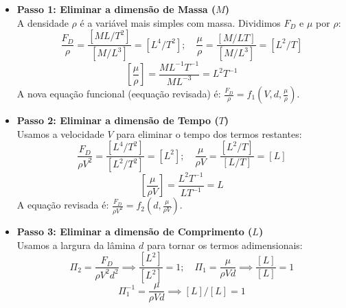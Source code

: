 \begin{itemize}
\item \textbf{Passo 1: Eliminar a dimensão de Massa ($M$)} \\
A densidade $\rho$ é a variável mais simples com massa. Dividimos $F_D$ e $\mu$ por $\rho$:
\begin{equation*}
    \frac{F_D}{\rho} = \frac{[ML/T^2]}{[M/L^3]} = [L^4/T^2]; \quad \frac{\mu}{\rho} = \frac{[M/LT]}{[M/L^3]} = [L^2/T]
\end{equation*}
\begin{equation*}
    \left[ \frac{\mu}{\rho} \right] = \frac{ML^{-1}T^{-1}}{ML^{-3}} = L^2 T^{-1}
\end{equation*}
A nova equação funcional (eequação revisada) é: $\frac{F_D}{\rho} = f_1(V, d, \frac{\mu}{\rho})$.


\item \textbf{Passo 2: Eliminar a dimensão de Tempo ($T$)} \\
Usamos a velocidade $V$ para eliminar o tempo dos termos restantes:
\begin{equation*}
    \frac{F_D}{\rho V^2} = \frac{[L^4/T^2]}{[L^2/T^2]} = [L^2]; \quad \frac{\mu}{\rho V} = \frac{[L^2/T]}{[L/T]} = [L]
\end{equation*}
\begin{equation*}
    \left[ \frac{\mu}{\rho V} \right] = \frac{L^2 T^{-1}}{LT^{-1}} = L
\end{equation*}
A equação revisada é: $\frac{F_D}{\rho V^2} = f_2(d, \frac{\mu}{\rho V})$.

\item \textbf{Passo 3: Eliminar a dimensão de Comprimento ($L$)} \\
Usamos a largura da lâmina $d$ para tornar os termos adimensionais:
\begin{equation*}
    \Pi_2 = \frac{F_D}{\rho V^2 d^2} \implies \frac{[L^2]}{[L^2]} = 1; \quad \Pi_1 = \frac{\mu}{\rho V d} \implies \frac{[L]}{[L]} = 1
\end{equation*}
\begin{equation*}
    \Pi_1^{-1} = \frac{\mu}{\rho V d} \implies [L] / [L] = 1
\end{equation*}
\end{itemize}

